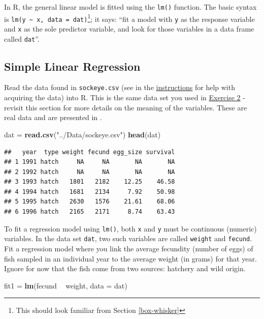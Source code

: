 \documentclass[]{book}
\newenvironment{Shaded}{\begin{snugshade}}{\end{snugshade}}
\newcommand{\DataTypeTok}[1]{\textcolor[rgb]{0.13,0.29,0.53}{#1}}
\newcommand{\KeywordTok}[1]{\textcolor[rgb]{0.13,0.29,0.53}{\textbf{#1}}}
\newcommand{\NormalTok}[1]{#1}
\newcommand{\OperatorTok}[1]{\textcolor[rgb]{0.81,0.36,0.00}{\textbf{#1}}}
\newcommand{\StringTok}[1]{\textcolor[rgb]{0.31,0.60,0.02}{#1}}
\let\rmarkdownfootnote\footnote%
\def\footnote{\protect\rmarkdownfootnote}
\begin{document}
In R, the general linear model is fitted using the \texttt{lm()} function. The basic syntax is \texttt{lm(y\ \textasciitilde{}\ x,\ data\ =\ dat)}\footnote{This should look familiar from Section \ref{box-whisker}}; it says: ``fit a model with \texttt{y} as the response variable and \texttt{x} as the sole predictor variable, and look for those variables in a data frame called \texttt{dat}''.

\hypertarget{regression}{%
\subsection{Simple Linear Regression}\label{regression}}

Read the data found in \texttt{sockeye.csv} (see in the \protect\hyperlink{data-sets}{instructions} for help with acquiring the data) into R. This is the same data set you used in \protect\hyperlink{ex2}{Exercise 2} - revisit this section for more details on the meaning of the variables. These are real data and are presented in \citet{sockeye-cite}.

\begin{Shaded}
\begin{Highlighting}[]
\NormalTok{dat =}\StringTok{ }\KeywordTok{read.csv}\NormalTok{(}\StringTok{"../Data/sockeye.csv"}\NormalTok{)}
\KeywordTok{head}\NormalTok{(dat)}
\end{Highlighting}
\end{Shaded}

\begin{verbatim}
##   year  type weight fecund egg_size survival
## 1 1991 hatch     NA     NA       NA       NA
## 2 1992 hatch     NA     NA       NA       NA
## 3 1993 hatch   1801   2182    12.25    46.58
## 4 1994 hatch   1681   2134     7.92    50.98
## 5 1995 hatch   2630   1576    21.61    68.06
## 6 1996 hatch   2165   2171     8.74    63.43
\end{verbatim}

To fit a regression model using \texttt{lm()}, both \texttt{x} and \texttt{y} must be continuous (numeric) variables. In the data set \texttt{dat}, two such variables are called \texttt{weight} and \texttt{fecund}. Fit a regression model where you link the average fecundity (number of eggs) of fish sampled in an individual year to the average weight (in grams) for that year. Ignore for now that the fish come from two sources: hatchery and wild origin.

\begin{Shaded}
\begin{Highlighting}[]
\NormalTok{fit1 =}\StringTok{ }\KeywordTok{lm}\NormalTok{(fecund }\OperatorTok{~}\StringTok{ }\NormalTok{weight, }\DataTypeTok{data =}\NormalTok{ dat)}
\end{Highlighting}
\end{Shaded}
\end{document}
